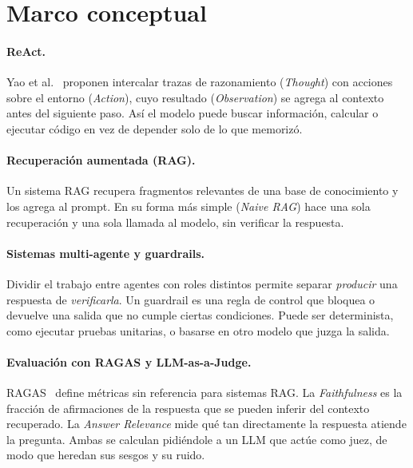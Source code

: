 \section{Marco conceptual}\label{sec:marco}

\paragraph{ReAct.}
Yao et al.~\cite{react} proponen intercalar trazas de razonamiento (\emph{Thought}) con acciones sobre el entorno (\emph{Action}), cuyo resultado (\emph{Observation}) se agrega al contexto antes del siguiente paso.
Así el modelo puede buscar información, calcular o ejecutar código en vez de depender solo de lo que memorizó.

\paragraph{Recuperación aumentada (RAG).}
Un sistema RAG recupera fragmentos relevantes de una base de conocimiento y los agrega al prompt.
En su forma más simple (\emph{Naive RAG}) hace una sola recuperación y una sola llamada al modelo, sin verificar la respuesta.

\paragraph{Sistemas multi-agente y guardrails.}
Dividir el trabajo entre agentes con roles distintos permite separar \emph{producir} una respuesta de \emph{verificarla}.
Un guardrail es una regla de control que bloquea o devuelve una salida que no cumple ciertas condiciones.
Puede ser determinista, como ejecutar pruebas unitarias, o basarse en otro modelo que juzga la salida.

\paragraph{Evaluación con RAGAS y LLM-as-a-Judge.}
RAGAS~\cite{ragas} define métricas sin referencia para sistemas RAG.
La \emph{Faithfulness} es la fracción de afirmaciones de la respuesta que se pueden inferir del contexto recuperado.
La \emph{Answer Relevance} mide qué tan directamente la respuesta atiende la pregunta.
Ambas se calculan pidiéndole a un LLM que actúe como juez, de modo que heredan sus sesgos y su ruido.
